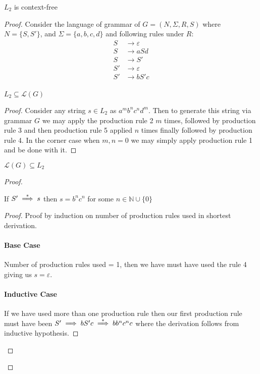 \begin{soln}
\begin{claim}
$L_2$ is context-free
\end{claim}
\begin{proof}
Consider the language of grammar of $G = (N, \Sigma, R, S)$ where $N = \{S, S'\}$,
and $\Sigma = \{a, b, c, d\}$ and following rules under $R$:
\begin{align*}
    S &\rightarrow \varepsilon\\
    S &\rightarrow a S d\\
    S &\rightarrow S'\\
    S' &\rightarrow \varepsilon\\
    S' &\rightarrow b S' c\\
\end{align*}

\begin{claim}
$L_2 \subseteq \mathcal{L}(G)$
\end{claim}
\begin{proof}
Consider any string $s \in L_2$ as $a^m b^n c^n d^m$.
Then to generate this string via grammar $G$ we may apply the production rule 2 $m$ times,
followed by production rule 3 and then production rule 5 applied $n$ times finally followed by production rule 4.
In the corner case when $m, n = 0$ we may simply apply production rule 1 and be done with it.
\end{proof}

\begin{claim}
$\mathcal{L}(G) \subseteq L_2$
\end{claim}
\begin{proof}
\begin{claim}
If $S' \stackrel{*}{\implies} s$ then $s = b^n c^n$ for some $n \in \mathbb{N} \cup \{0\}$
\end{claim}
\begin{proof}
Proof by induction on number of production rules used in shortest derivation.
\paragraph{Base Case} Number of production rules used = 1, then we have must have used the rule 4 giving us $s = \varepsilon$.
\paragraph{Inductive Case} If we have used more than one production rule then our first production rule must have been
$S' \implies b S' c \stackrel{*}{\implies} b b^n c^n c$ where the derivation follows from inductive hypothesis.
\end{proof}


\end{proof}
\end{proof}
\end{soln}
